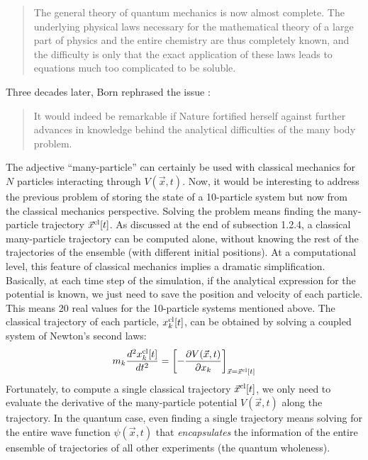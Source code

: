 \documentclass[nofootinbib, secnumarabic, amsmath, nobibnotes,11pt,aps,pra, floatfix]{revtex4-1}
\begin{document}
\begin{quote}
The general theory of quantum mechanics is now almost complete. The underlying physical laws necessary for the mathematical theory of a large part of physics and the entire chemistry are thus completely known, and the difficulty is only that the exact application of these laws leads to equations much too complicated to be soluble.\vspace*{-6pt}\\
\end{quote}

Three decades later, Born rephrased the issue \cite{om.born1960bis}:\\\vspace*{-6pt}

\begin{quote}
It would indeed be remarkable if Nature fortified herself against further advances in knowledge behind the analytical difficulties of the many body problem.\vspace*{-6pt}\\
\end{quote}

The adjective ``many-particle'' can certainly be used with classical
mechanics for $N$ particles interacting through $V(\vec{x},t)$. Now,
it would be interesting to address the previous problem of storing
the state of a 10-particle system but now from the classical
mechanics perspective. Solving the problem means finding the
many-particle trajectory $\vec x^{\rm cl}[t]$. As discussed at the
end of subsection 1.2.4, a classical many-particle trajectory can be
computed alone, without knowing the rest of the trajectories of the
ensemble (with different initial positions). At a computational
level, this feature of classical mechanics implies a dramatic
simplification. Basically, at each time step of the simulation, if
the analytical expression for the potential is known, we just need
to save the position and velocity of each particle. This means 20
real values for the 10-particle systems mentioned above. The
classical trajectory of each particle, $x^{\rm cl}_k[t]$, can be
obtained by solving a coupled system of Newton's  second laws:
\begin{equation}\label{om.NewtonMP}
m_k\frac{d^2 x^{\rm cl}_k[t]} {dt^2} = \left [-\frac{\partial V(\vec{x},t)}{\partial x_k} \right ]_{\vec x = \vec x^{\rm cl}[t]}
\end{equation}
Fortunately, to compute a single classical trajectory $\vec x^{\rm
cl}[t]$, we only need to evaluate the derivative of the
many-particle potential $V(\vec{x},t)$ along the trajectory. In the
quantum case, even finding a single trajectory means solving for the
entire wave function $\psi(\vec{x},t)$ that \emph{encapsulates} the information
of the entire ensemble of trajectories of all other experiments (the quantum wholeness). 
\end{document}
